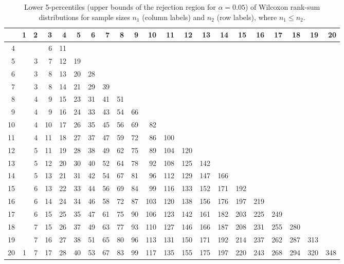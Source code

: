 \begin{table}[ht]
\centering
\begin{tabular}{@{}r@{~~}r@{~~}r@{~~}r@{~~}r@{~~}r@{~~}r@{~~}r@{~~}r@{~~}r@{~~}r@{~~}r@{~~}r@{~~}r@{~~}r@{~~}r@{~~}r@{~~}r@{~~}r@{~~}r@{~~}r@{}}
  \hline
 & 1 & 2 & 3 & 4 & 5 & 6 & 7 & 8 & 9 & 10 & 11 & 12 & 13 & 14 & 15 & 16 & 17 & 18 & 19 & 20 \\ 
  \hline
  4 &  &  & 6 & 11 &  &  &  &  &  &  &  &  &  &  &  &  &  &  &  &  \\ 
  5 &  & 3 & 7 & 12 & 19 &  &  &  &  &  &  &  &  &  &  &  &  &  &  &  \\ 
  6 &  & 3 & 8 & 13 & 20 & 28 &  &  &  &  &  &  &  &  &  &  &  &  &  &  \\ 
  7 &  & 3 & 8 & 14 & 21 & 29 & 39 &  &  &  &  &  &  &  &  &  &  &  &  &  \\ 
  8 &  & 4 & 9 & 15 & 23 & 31 & 41 & 51 &  &  &  &  &  &  &  &  &  &  &  &  \\ 
  9 &  & 4 & 9 & 16 & 24 & 33 & 43 & 54 & 66 &  &  &  &  &  &  &  &  &  &  &  \\ 
  10 &  & 4 & 10 & 17 & 26 & 35 & 45 & 56 & 69 & 82 &  &  &  &  &  &  &  &  &  &  \\ 
  11 &  & 4 & 11 & 18 & 27 & 37 & 47 & 59 & 72 & 86 & 100 &  &  &  &  &  &  &  &  &  \\ 
  12 &  & 5 & 11 & 19 & 28 & 38 & 49 & 62 & 75 & 89 & 104 & 120 &  &  &  &  &  &  &  &  \\ 
  13 &  & 5 & 12 & 20 & 30 & 40 & 52 & 64 & 78 & 92 & 108 & 125 & 142 &  &  &  &  &  &  &  \\ 
  14 &  & 5 & 13 & 21 & 31 & 42 & 54 & 67 & 81 & 96 & 112 & 129 & 147 & 166 &  &  &  &  &  &  \\ 
  15 &  & 6 & 13 & 22 & 33 & 44 & 56 & 69 & 84 & 99 & 116 & 133 & 152 & 171 & 192 &  &  &  &  &  \\ 
  16 &  & 6 & 14 & 24 & 34 & 46 & 58 & 72 & 87 & 103 & 120 & 138 & 156 & 176 & 197 & 219 &  &  &  &  \\ 
  17 &  & 6 & 15 & 25 & 35 & 47 & 61 & 75 & 90 & 106 & 123 & 142 & 161 & 182 & 203 & 225 & 249 &  &  &  \\ 
  18 &  & 7 & 15 & 26 & 37 & 49 & 63 & 77 & 93 & 110 & 127 & 146 & 166 & 187 & 208 & 231 & 255 & 280 &  &  \\ 
  19 &  & 7 & 16 & 27 & 38 & 51 & 65 & 80 & 96 & 113 & 131 & 150 & 171 & 192 & 214 & 237 & 262 & 287 & 313 &  \\ 
  20 & 1 & 7 & 17 & 28 & 40 & 53 & 67 & 83 & 99 & 117 & 135 & 155 & 175 & 197 & 220 & 243 & 268 & 294 & 320 & 348 \\ 
   \hline
\end{tabular}
\caption{Lower 5-percentiles (upper bounds of the rejection region for $\alpha=0.05$) of Wilcoxon rank-sum distributions for sample sizes $n_1$ (column labels) and $n_2$ (row labels), where ${n_1}\leq{n_2}$.}
\label{tab:w0.05}
\end{table}
